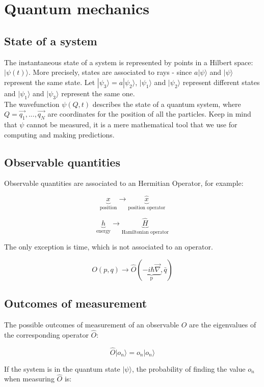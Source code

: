 \chapter{Quantum mechanics}

\section{State of a system}
The instantaneous state of a system is represented by points in a Hilbert space: $|\psi(t)\rangle$.
More precisely,  states are associated to rays - since $a|\psi\rangle$ and $|\psi\rangle$ represent the same state.
Let $|\psi_3\rangle = a |\psi_2\rangle$, $|\psi_1\rangle$ and $|\psi_2\rangle$ represent different states and $|\psi_1\rangle$ and $|\psi_3\rangle$ represent the same one.\\
\noindent
The wavefunction $\psi(Q,t)$ describes the state of a quantum system, where $Q=\vec{q_1},...,\vec{q_N}$ are coordinates for the position of all the particles. Keep in mind that $\psi$ cannot be measured, it is a mere mathematical tool that we use for computing and making predictions.

\section{Observable quantities}
Observable quantities are associated to an Hermitian Operator, for example:

$$\underbrace{x}_{\text{position}}\rightarrow\underbrace{\hat{x}}_{\text{position operator}}$$

$$\underbrace{h}_{\text{energy}}\rightarrow\underbrace{\hat{H}}_{\text{Hamiltonian operator}}$$

The only exception is time, which is not associated to an operator. 

$$O(p,q)\rightarrow\hat{O}(\underbrace{-i\hbar\vec{\nabla}}_{\text{p}},\bar{q})$$

\section{Outcomes of measurement}
The possible outcomes of measurement of an observable $O$ are the eigenvalues of the corresponding operator $\hat{O}$:

$$\hat{O}|o_n\rangle = o_n|o_n\rangle$$

If the system is in the quantum state $|\psi\rangle$, the probability of finding the value $o_n$ when measuring $\hat{O}$ is:

